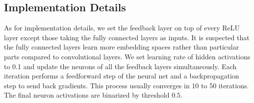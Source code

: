 \subsection{Implementation Details}
As for implementation details, we set the feedback layer on top of every ReLU layer except those taking the fully connected layers as inputs. It is suspected that the fully connected layers learn more embedding spaces rather than particular parts compared to convolutional layers. We set learning rate of hidden activations to 0.1 and update the neurons of all the feedback layers simultaneously. Each iteration performs a feedforward step of the neural net and a backpropagation step to send back gradients. This process usually converges in 10 to 50 iterations. The final {\color{red} neuron activations} are binarized by threshold $0.5$.
